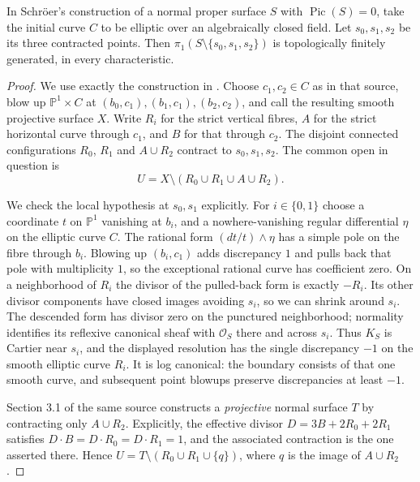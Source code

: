 \begin{corollary}
\label{D:schroer-elliptic}
In Schr\"oer's construction of a normal proper surface $S$ with
$\operatorname{Pic}(S)=0$, take the initial curve $C$ to be elliptic
over an algebraically closed field.  Let $s_0,s_1,s_2$ be its three
contracted points.  Then
$\pi_1(S\setminus\{s_0,s_1,s_2\})$ is topologically finitely
generated, in every characteristic.
\end{corollary}
\begin{proof}
We use exactly the construction in
\cite[sections 2.5 and 3.1--3.2, author's PDF pp.~4--5]{Schroer1999D}.
Choose $c_1,c_2\in C$ as in that source, blow up
$\mathbb P^1\times C$ at $(b_0,c_1),(b_1,c_1),(b_2,c_2)$,
and call the resulting smooth projective surface $X$.
Write $R_i$ for the strict vertical fibres, $A$ for the strict
horizontal curve through $c_1$, and $B$ for that through $c_2$.
The disjoint connected configurations $R_0$, $R_1$ and $A\cup R_2$
contract to $s_0,s_1,s_2$.  The common open in question is
\[
 U=X\setminus(R_0\cup R_1\cup A\cup R_2).
\]

We check the local hypothesis at $s_0,s_1$ explicitly.  For
$i\in\{0,1\}$ choose a coordinate $t$ on $\mathbb P^1$ vanishing
at $b_i$, and a nowhere-vanishing regular differential $\eta$ on
the elliptic curve $C$.  The rational form
$(dt/t)\wedge\eta$ has a simple pole on the fibre through $b_i$.
Blowing up $(b_i,c_1)$ adds discrepancy $1$ and pulls back that
pole with multiplicity $1$, so the exceptional rational curve has
coefficient zero.  On a neighborhood of $R_i$ the divisor of the
pulled-back form is exactly $-R_i$.  Its other divisor components
have closed images avoiding $s_i$, so we can shrink around $s_i$.
The descended form has divisor zero on the punctured neighborhood;
normality identifies its reflexive canonical sheaf with
$\mathcal O_S$ there and across $s_i$.  Thus $K_S$ is Cartier near
$s_i$, and the displayed resolution has the single discrepancy
$-1$ on the smooth elliptic curve $R_i$.  It is log canonical:
the boundary consists of that one smooth curve, and subsequent
point blowups preserve discrepancies at least $-1$.

Section 3.1 of the same source constructs a \emph{projective}
normal surface $T$ by contracting only $A\cup R_2$.  Explicitly,
the effective divisor $D=3B+2R_0+2R_1$ satisfies
$D\cdot B=D\cdot R_0=D\cdot R_1=1$, and the associated contraction
is the one asserted there.  Hence
$U=T\setminus(R_0\cup R_1\cup\{q\})$, where $q$ is the image of
$A\cup R_2$.


\end{proof}
